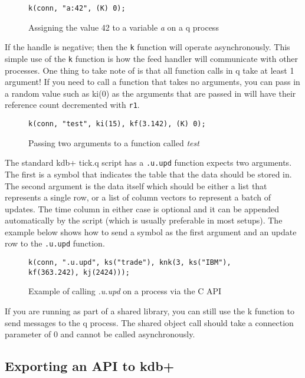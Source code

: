 \begin{figure}
\begin{lstlisting}
k(conn, "a:42", (K) 0);
\end{lstlisting}
\caption{Assigning the value 42 to a variable \textit{a} on a q process}
\end{figure}

If the handle is negative; then the \verb|k| function will operate asynchronously. This simple use of the \verb|k| function is how the feed handler will communicate with other processes. One thing to take note
of is that all function calls in q take at least 1 argument! If you need to call a function that takes
no arguments, you can pass in a random value such as ki(0) as the arguments that are passed in will have
their reference count decremented with \verb|r1|.

\begin{figure}
\begin{lstlisting}
k(conn, "test", ki(15), kf(3.142), (K) 0);
\end{lstlisting}
\caption{Passing two arguments to a function called \textit{test}}
\end{figure}

The standard kdb+ tick.q script has a \verb|.u.upd| function expects two arguments. The first is a
symbol that indicates the table that the data should be stored in. The second argument is the data itself which should be either a list that represents a single row, or a list of column vectors to represent a batch of updates. The time column in either case is optional and it can be appended automatically by the script (which is usually preferable in most setups). The example below shows how to send a symbol as the first argument and an update row to the \verb|.u.upd| function.

\begin{figure}
\begin{lstlisting}
k(conn, ".u.upd", ks("trade"), knk(3, ks("IBM"), kf(363.242), kj(2424)));
\end{lstlisting}
\caption{Example of calling \textit{.u.upd} on a process via the C API}
\end{figure}

If you are running as part of a shared library, you can still use the k function to send messages to the q process. The shared object call should take a connection parameter of 0 and cannot be called asynchronously.

\subsection{Exporting an API to kdb+}

